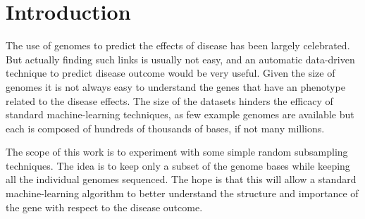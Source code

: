 \section{Introduction}
\label{sec:intro}
The use of genomes to predict the effects of disease has been largely celebrated.
But actually finding such links is usually not easy, and an automatic data-driven technique to predict disease outcome would be very useful.
Given the size of genomes it is not always easy to understand the genes that have an phenotype related to the disease effects.
The size of the datasets hinders the efficacy of standard machine-learning techniques, as few example genomes are available but each is composed of hundreds of thousands of bases, if not many millions.

The scope of this work is to experiment with some simple random subsampling techniques. The idea is to keep only a subset of the genome bases while keeping all the individual genomes sequenced.
The hope is that this will allow a standard machine-learning algorithm to better understand the structure and importance of the gene with respect to the disease outcome.

